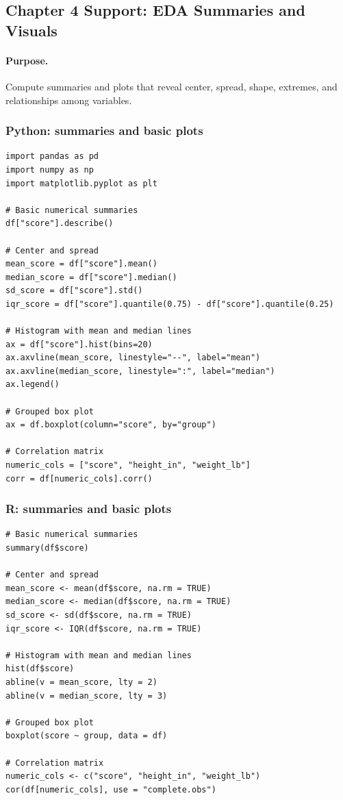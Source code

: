 \subsection{Chapter 4 Support: EDA Summaries and Visuals}
\label{app:ch04-software-cookbook-eda-patterns}

\paragraph{Purpose.} Compute summaries and plots that reveal center, spread, shape, extremes, and relationships among variables.

\subsubsection*{Python: summaries and basic plots}

\begin{verbatim}
import pandas as pd
import numpy as np
import matplotlib.pyplot as plt

# Basic numerical summaries
df["score"].describe()

# Center and spread
mean_score = df["score"].mean()
median_score = df["score"].median()
sd_score = df["score"].std()
iqr_score = df["score"].quantile(0.75) - df["score"].quantile(0.25)

# Histogram with mean and median lines
ax = df["score"].hist(bins=20)
ax.axvline(mean_score, linestyle="--", label="mean")
ax.axvline(median_score, linestyle=":", label="median")
ax.legend()

# Grouped box plot
ax = df.boxplot(column="score", by="group")

# Correlation matrix
numeric_cols = ["score", "height_in", "weight_lb"]
corr = df[numeric_cols].corr()
\end{verbatim}

\subsubsection*{R: summaries and basic plots}

\begin{verbatim}
# Basic numerical summaries
summary(df$score)

# Center and spread
mean_score <- mean(df$score, na.rm = TRUE)
median_score <- median(df$score, na.rm = TRUE)
sd_score <- sd(df$score, na.rm = TRUE)
iqr_score <- IQR(df$score, na.rm = TRUE)

# Histogram with mean and median lines
hist(df$score)
abline(v = mean_score, lty = 2)
abline(v = median_score, lty = 3)

# Grouped box plot
boxplot(score ~ group, data = df)

# Correlation matrix
numeric_cols <- c("score", "height_in", "weight_lb")
cor(df[numeric_cols], use = "complete.obs")
\end{verbatim}

